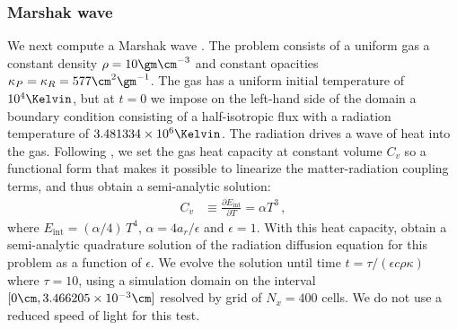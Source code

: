 \documentclass[fleqn,usenatbib]{mnras}
\begin{document}
\subsubsection{Marshak wave}
We next compute a Marshak wave \citep{Marshak_1958}. The problem consists of a uniform gas a constant density $\rho = 10 \gm \cm^{-3}$ and constant opacities $\kappa_P = \kappa_R = 577 \cm^{2} \gm^{-1}$. The gas has a uniform initial temperature of $10^4 \Kelvin$, but at $t=0$ we impose on the left-hand side of the domain a boundary condition consisting of a half-isotropic flux with a radiation temperature of $3.481334 \times 10^6 \Kelvin$. The radiation drives a wave of heat into the gas. Following \cite{Su_1996}, we set the gas heat capacity at constant volume $C_v$ so a functional form that makes it possible to linearize the matter-radiation coupling terms, and thus obtain a semi-analytic solution:
\begin{align}
C_v &\equiv \frac{\partial E_{\text{int}}}{\partial T} = \alpha T^3 \, ,
\label{eq:heat_capacity}
\end{align}
where $E_{\text{int}} = (\alpha / 4) \, T^4$, $\alpha = 4 a_r / \epsilon$ and $\epsilon = 1$. With this heat capacity, \cite{Su_1996} obtain a semi-analytic quadrature solution of the radiation diffusion equation for this problem as a function of $\epsilon$. We evolve the solution until time $t = \tau / (\epsilon c \rho \kappa)$ where $\tau = 10$, using a simulation domain on the interval $[0 \cm, 3.466205 \times 10^{-3}\cm]$ resolved by grid of $N_x = 400$ cells. We do not use a reduced speed of light for this test.
\end{document}
